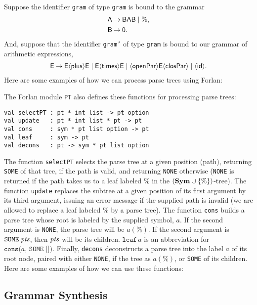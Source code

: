 Suppose the identifier \texttt{gram} of type \texttt{gram} is bound to the
grammar
\begin{align*}
\mathsf{A} &\mathbin{\to} \mathsf{B}\mathsf{A}\mathsf{B} \mid \% , \\
\mathsf{B} &\mathbin{\to} \mathsf{0} .
\end{align*}
And, suppose that the identifier
\texttt{gram'} of type \texttt{gram} is bound to our grammar of
arithmetic expressions,
\begin{gather*}
\mathsf{E\mathbin{\to} E{\langle\mathsf{plus}\rangle} E\mid E{\langle\mathsf{times}\rangle} E\mid {\langle\mathsf{openPar}\rangle} E{\langle\mathsf{closPar}\rangle} \mid
{\langle\mathsf{id}\rangle}} .
\end{gather*}
Here are some examples of how we can process parse trees using Forlan:


The Forlan module \texttt{PT} also defines these functions
for processing parse trees:
\begin{verbatim}
val selectPT : pt * int list -> pt option
val update   : pt * int list * pt -> pt
val cons     : sym * pt list option -> pt
val leaf     : sym -> pt
val decons   : pt -> sym * pt list option
\end{verbatim}
%
%
%
%
%
The function \texttt{selectPT} selects the parse tree at
a given position (path), returning \texttt{SOME} of that tree,
if the path is valid, and returning \texttt{NONE} otherwise
(\texttt{NONE} is returned if the path takes us to a leaf 
labeled $\%$ in the $(\mathbf{Sym}\cup\{\%\})$-tree). The
function \texttt{update} replaces the subtree at a given position
of its first argument by its third argument, issuing an error
message if the supplied path is invalid (we are allowed to replace
a leaf labeled $\%$ by a parse tree). The function \texttt{cons}
builds a parse tree whose root is labeled by the supplied symbol, $a$.
If the second argument is \texttt{NONE}, the parse tree will be $a(\%)$.
If the second argument is $\texttt{SOME}\;{\it pts}$, then ${\it pts}$ will be
its children. $\texttt{leaf}\,a$ is an abbreviation for
$\texttt{cons(}a\texttt{, SOME [])}$. Finally, \texttt{decons}
deconstructs a parse tree into the label $a$ of its root node, paired
with either \texttt{NONE}, if the tree as $a(\%)$, or \texttt{SOME}
of its children.
Here are some examples of how we can use these functions:


\subsection{Grammar Synthesis}

